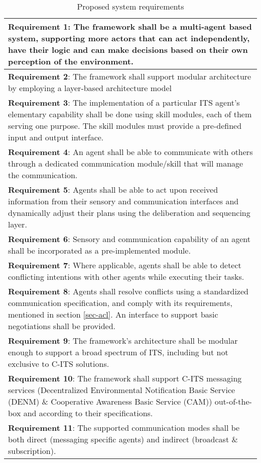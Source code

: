 \documentclass[0main.tex]{subfiles}
\begin{document}
\begin{table}[htbp]
    \small
    \caption{Proposed system requirements}
    \centering\begin{tabular}{>{\footnotesize}p{}}
        \toprule 
\textbf{Requirement 1}: The framework shall be a multi-agent based system, supporting more actors 
that can act independently, have their logic and can make decisions based on their 
own perception of the environment.
\\ \midrule
\textbf{Requirement 2}: The framework shall support modular architecture by employing a layer-based 
architecture model
\\ \midrule
\textbf{Requirement 3}: The implementation of a particular ITS agent's elementary
capability shall be done using skill modules, each of them serving one purpose. The skill modules must provide a
pre-defined input and output interface.
\\ \midrule
\textbf{Requirement 4}: An agent shall be able to communicate with others through a dedicated communication module/skill 
that will manage the communication.
\\ \midrule
\textbf{Requirement 5}: Agents shall be able to act upon received information from their sensory and communication interfaces
and dynamically adjust their plans using the deliberation and sequencing layer.
\\ \midrule
\textbf{Requirement 6}: Sensory and communication capability of an agent shall be incorporated 
as a pre-implemented module.
\\ \midrule
\textbf{Requirement 7}: Where applicable, agents shall be able to detect conflicting intentions with other agents
while executing their tasks. 
\\ \midrule
\textbf{Requirement 8}: Agents shall resolve conflicts using a standardized communication
specification, and comply with its requirements, mentioned in section \ref{sec-acl}. An
interface to support basic negotiations shall be provided.
\\ \midrule
\textbf{Requirement 9}: The framework's architecture shall be modular enough to support a broad 
spectrum of ITS, including but not exclusive to C-ITS solutions.
\\ \midrule
\textbf{Requirement 10}: The framework shall support C-ITS messaging services (Decentralized
Environmental Notification Basic Service (DENM) \& Cooperative Awareness Basic Service (CAM))
out-of-the-box and according to their specifications.
\\ \midrule
\textbf{Requirement 11}: The supported communication modes shall be both direct (messaging specific agents) and indirect  
(broadcast \& subscription). 
\\ \bottomrule
    \end{tabular}
    \label{sys-requirements}
\end{table}

\clearpage
\end{document}

